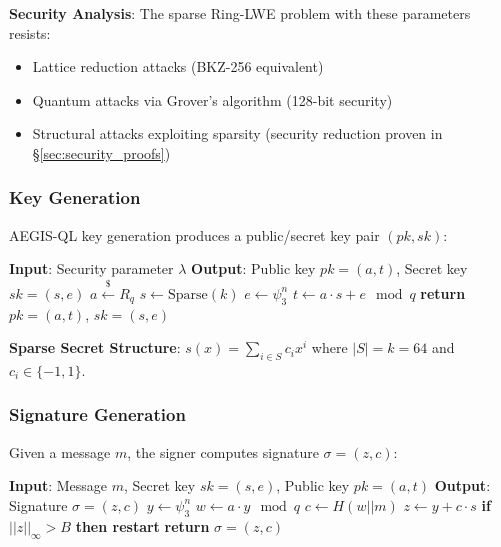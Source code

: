 \documentclass[11pt,a4paper]{article}
\begin{document}
\textbf{Security Analysis}: The sparse Ring-LWE problem with these parameters resists:
\begin{itemize}
    \item Lattice reduction attacks (BKZ-256 equivalent)
    \item Quantum attacks via Grover's algorithm (128-bit security)
    \item Structural attacks exploiting sparsity (security reduction proven in \S\ref{sec:security_proofs})
\end{itemize}

\subsubsection{Key Generation}

AEGIS-QL key generation produces a public/secret key pair $(pk, sk)$:

\begin{algorithm}[H]
\caption{AEGIS-QL Key Generation}
\begin{algorithmic}[1]
\State \textbf{Input}: Security parameter $\lambda$
\State \textbf{Output}: Public key $pk = (a, t)$, Secret key $sk = (s, e)$
\State
\State $a \xleftarrow{\$} R_q$ 
\State $s \leftarrow \text{Sparse}(k)$ 
\State $e \leftarrow \psi_3^n$ 
\State $t \leftarrow a \cdot s + e \mod q$ 
\State
\State \textbf{return} $pk = (a, t)$, $sk = (s, e)$
\end{algorithmic}
\end{algorithm}

\textbf{Sparse Secret Structure}: $s(x) = \sum_{i \in S} c_i x^i$ where $|S| = k = 64$ and $c_i \in \{-1, 1\}$.

\subsubsection{Signature Generation}

Given a message $m$, the signer computes signature $\sigma = (z, c)$:

\begin{algorithm}[H]
\caption{AEGIS-QL Signature}
\begin{algorithmic}[1]
\State \textbf{Input}: Message $m$, Secret key $sk = (s, e)$, Public key $pk = (a, t)$
\State \textbf{Output}: Signature $\sigma = (z, c)$
\State
\State $y \leftarrow \psi_3^n$ 
\State $w \leftarrow a \cdot y \mod q$
\State $c \leftarrow H(w || m)$ 
\State $z \leftarrow y + c \cdot s$ 
\State
\State \textbf{if} $||z||_\infty > B$ \textbf{then restart} 
\State \textbf{return} $\sigma = (z, c)$
\end{algorithmic}
\end{algorithm}
\end{document}
